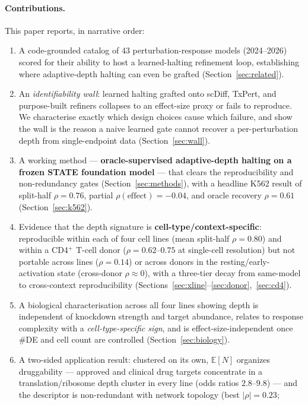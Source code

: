 \documentclass[11pt]{article}
\newcommand{\EN}{\ensuremath{\mathbb{E}[N]}}
\let\mathrho\rho
\renewcommand{\rho}{\ensuremath{\mathrho}}
\begin{document}
\paragraph{Contributions.} This paper reports, in narrative order:
\begin{enumerate}[leftmargin=1.4em,itemsep=1pt]
\item A code-grounded catalog of 43 perturbation-response models (2024--2026) scored for their
ability to host a learned-halting refinement loop, establishing where adaptive-depth halting can
even be grafted (Section~\ref{sec:related}).
\item An \emph{identifiability wall}: learned halting grafted onto scDiff, TxPert, and
purpose-built refiners collapses to an effect-size proxy or fails to reproduce. We characterise
exactly which design choices cause which failure, and show the wall is the reason a naive learned
gate cannot recover a per-perturbation depth from single-endpoint data (Section~\ref{sec:wall}).
\item A working method --- \textbf{oracle-supervised adaptive-depth halting on a frozen STATE
foundation model} --- that clears the reproducibility and non-redundancy gates
(Section~\ref{sec:methods}), with a headline K562 result of split-half \rho{}$=0.76$, partial
$\rho(\text{effect})=-0.04$, and oracle recovery \rho{}$=0.61$ (Section~\ref{sec:k562}).
\item Evidence that the depth signature is \textbf{cell-type/context-specific}: reproducible within
each of four cell lines (mean split-half \rho{}$=0.80$) and within a CD4$^+$ T-cell donor
(\rho{}$=0.62$--$0.75$ at single-cell resolution) but not portable across lines (\rho{}$=0.14$) or
across donors in the resting/early-activation state (cross-donor \rho{}$\approx0$), with a
three-tier decay from same-model to cross-context reproducibility
(Sections~\ref{sec:xline}--\ref{sec:donor},~\ref{sec:cd4}).
\item A biological characterisation across all four lines showing depth is independent of
knockdown strength and target abundance, relates to response complexity with a
\emph{cell-type-specific sign}, and is effect-size-independent once \#DE and cell count are
controlled (Section~\ref{sec:biology}).
\item A two-sided application result: clustered on its own, \EN{} organizes druggability --- approved
and clinical drug targets concentrate in a translation/ribosome depth cluster in every line (odds
ratios $2.8$--$9.8$) --- and the descriptor is non-redundant with network topology (best $|\rho|=0.23$;

\end{enumerate}
\end{document}
